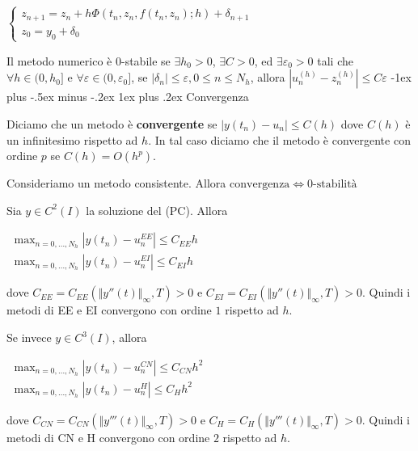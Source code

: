 \documentclass[8pt,a4paper]{article}
\makeatletter
\renewcommand{\subsubsection}{\@startsection{subsubsection}{3}{0mm}%
                                {-1ex plus -.5ex minus -.2ex}%
                                {1ex plus .2ex}%
                                {\normalfont\small\bfseries}}
\makeatother
\begin{document}
\begin{multicols}{2}
$\begin{cases}
z_{n+1} =z_{n} +h\Phi ( t_{n} ,z_{n} ,f( t_{n} ,z_{n}) ;h) +\boxed{\delta _{n+1}}\\
z_{0} =y_{0} +\boxed{\delta _{0}}
\end{cases}$

Il metodo numerico è $0$-stabile se $\exists h_{0}  >0$, $\exists C >0$, ed $\exists \varepsilon _{0}  >0$ tali che $\forall h\in ( 0,h_{0}]$ e $\forall \varepsilon \in ( 0,\varepsilon _{0}]$, se $| \delta _{n}| \leqslant \varepsilon ,0\leqslant n\leqslant N_{h}$, allora $\boxed{\left| u^{( h)}_{n} -z^{( h)}_{n}\right| \leqslant C\varepsilon }$
\subsubsection{Convergenza}

Diciamo che un metodo è \textbf{convergente} se $\boxed{| y( t_{n}) -u_{n}| \leqslant C( h)}$ dove $C( h)$ è un infinitesimo rispetto ad $h$. In tal caso diciamo che il metodo è convergente con ordine $p$ se $C( h) =O\left( h^{p}\right)$.

Consideriamo un metodo consistente. Allora $\boxed{\text{convergenza} \Leftrightarrow 0\text{-stabilità}}$

Sia $y\in C^{2}( I)$ la soluzione del (PC). Allora

$ \begin{array}{l}
\boxed{\max_{n=0,\dotsc ,N_{h}}\left| y( t_{n}) -u^{EE}_{n}\right| \leqslant C_{EE} h}\\
\boxed{\max_{n=0,\dotsc ,N_{h}}\left| y( t_{n}) -u^{EI}_{n}\right| \leqslant C_{EI} h}
\end{array}$

dove $C_{EE} =C_{EE}(\Vert y''( t)\Vert _{\infty } ,T)  >0$ e $C_{EI} =C_{EI}(\Vert y''( t)\Vert _{\infty } ,T)  >0$. Quindi i metodi di EE e EI convergono con ordine $1$ rispetto ad $h$.

Se invece $y\in C^{3}( I)$, allora

$ \begin{array}{l}
\boxed{\max_{n=0,\dotsc ,N_{h}}\left| y( t_{n}) -u^{CN}_{n}\right| \leqslant C_{CN} h^{2}}\\
\boxed{\max_{n=0,\dotsc ,N_{h}}\left| y( t_{n}) -u^{H}_{n}\right| \leqslant C_{H} h^{2}}
\end{array}$

dove $C_{CN} =C_{CN}(\Vert y'''( t)\Vert _{\infty } ,T)  >0$ e $C_{H} =C_{H}(\Vert y'''( t)\Vert _{\infty } ,T)  >0$. Quindi i metodi di CN e H convergono con ordine $2$ rispetto ad $h$.

\end{multicols}
\end{document}

